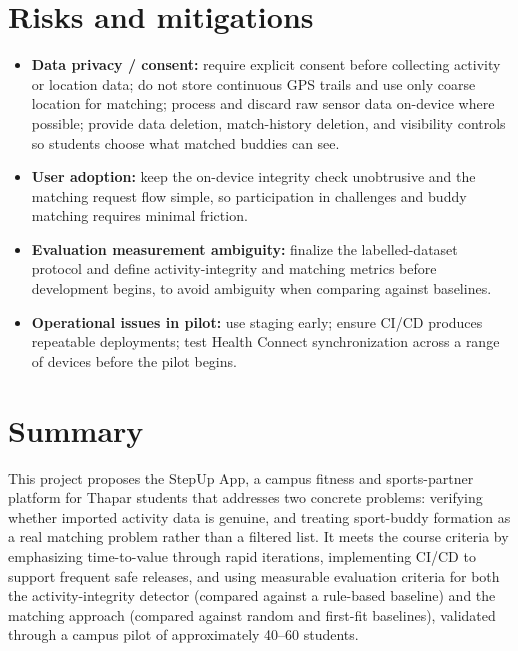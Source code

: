 \documentclass[11pt,a4paper]{article}
\begin{document}
\section{Risks and mitigations}
\begin{itemize}[leftmargin=0.7cm]
    \item \textbf{Data privacy / consent:} require explicit consent before collecting activity or location data; do not store continuous GPS trails and use only coarse location for matching; process and discard raw sensor data on-device where possible; provide data deletion, match-history deletion, and visibility controls so students choose what matched buddies can see.
    \item \textbf{User adoption:} keep the on-device integrity check unobtrusive and the matching request flow simple, so participation in challenges and buddy matching requires minimal friction.
    \item \textbf{Evaluation measurement ambiguity:} finalize the labelled-dataset protocol and define activity-integrity and matching metrics before development begins, to avoid ambiguity when comparing against baselines.
    \item \textbf{Operational issues in pilot:} use staging early; ensure CI/CD produces repeatable deployments; test Health Connect synchronization across a range of devices before the pilot begins.
\end{itemize}

\section{Summary}
This project proposes the StepUp App, a campus fitness and sports-partner
platform for Thapar students that addresses two concrete problems:
verifying whether imported activity data is genuine, and treating
sport-buddy formation as a real matching problem rather than a filtered
list. It meets the course criteria by emphasizing time-to-value through
rapid iterations, implementing CI/CD to support frequent safe releases,
and using measurable evaluation criteria for both the activity-integrity
detector (compared against a rule-based baseline) and the matching
approach (compared against random and first-fit baselines), validated
through a campus pilot of approximately 40--60 students.
\end{document}

